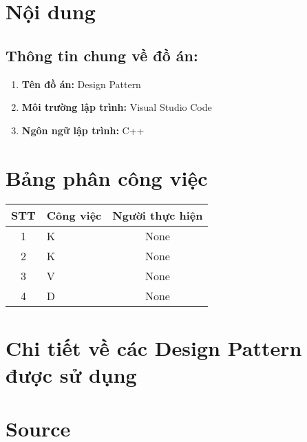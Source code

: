 \documentclass[a4paper,12pt]{report}
\begin{document}
\pagebreak
\section{Nội dung}
\subsection{Thông tin chung về đồ án:}
\begin{enumerate}
  \item \textbf{Tên đồ án:} Design Pattern
  \item \textbf{Môi trường lập trình:} Visual Studio Code
  \item \textbf{Ngôn ngữ lập trình:} C++
\end{enumerate}

\section{Bảng phân công việc}
\begin{center}
  \renewcommand{\arraystretch}{1.5}
  \begin{tabular}{|c|p{}|c|}
    \hline
    \textbf{STT} & \textbf{Công việc} & \textbf{Người thực hiện} \\\hline
    1            & K                  & None                     \\\hline
    2            & K                  & None                     \\\hline
    3            & V                  & None                     \\\hline
    4            & D                  & None                     \\\hline
  \end{tabular}
\end{center}

\pagebreak
\section{Chi tiết về các Design Pattern được sử dụng}





\pagebreak
\section{Source}
\end{document}
